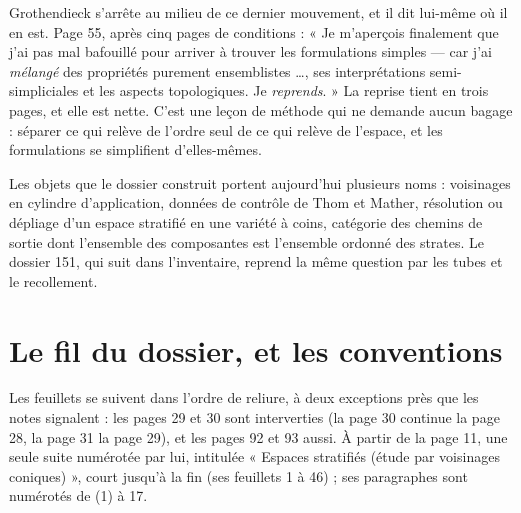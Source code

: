 \documentclass[11pt,a4paper]{article}
\begin{document}
\begin{resume}
Grothendieck s'arrête au milieu de ce dernier mouvement, et il dit lui-même
où il en est. Page 55, après cinq pages de conditions : « Je m'aperçois
finalement que j'ai pas mal bafouillé pour arriver à trouver les formulations
simples — car j'ai \emph{mélangé} des propriétés purement ensemblistes …, ses
interprétations semi-simpliciales et les aspects topologiques. Je
\emph{reprends}. » La reprise tient en trois pages, et elle est nette. C'est une
leçon de méthode qui ne demande aucun bagage : séparer ce qui relève de l'ordre
seul de ce qui relève de l'espace, et les formulations se simplifient d'elles-mêmes.

Les objets que le dossier construit portent aujourd'hui plusieurs noms : voisinages en
cylindre d'application, données de contrôle de Thom et Mather, résolution ou
dépliage d'un espace stratifié en une variété à coins, catégorie des chemins de
sortie dont l'ensemble des composantes est l'ensemble ordonné des strates. Le
dossier 151, qui suit dans l'inventaire, reprend la même question par les tubes
et le recollement.

\end{resume}

\section*{Le fil du dossier, et les conventions}

Les feuillets se suivent dans l'ordre de reliure, à deux exceptions près que
les notes signalent : les pages 29 et 30 sont interverties (la page 30 continue
la page 28, la page 31 la page 29), et les pages 92 et 93 aussi. À partir de la
page 11, une seule suite numérotée par lui, intitulée « Espaces stratifiés (étude
par voisinages coniques) », court jusqu'à la fin (ses feuillets 1 à 46) ; ses
paragraphes sont numérotés de (1) à 17.
\end{document}
